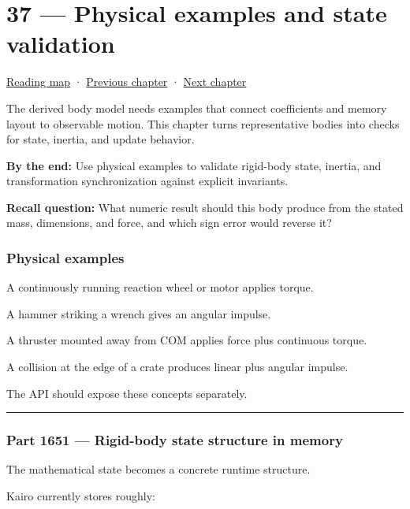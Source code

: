 \hypertarget{06-engine-ii-ch037}{}
\section{37 --- Physical examples and state validation}\label{physical-examples-and-state-validation}

\href{Chapter\%20Edition/03\%20-\%20Game\%20Engine/00\%20-\%20Reading\%20Map}{Reading map} · \hyperref[06-engine-ii-ch036]{Previous chapter} · \hyperref[06-engine-ii-ch038]{Next chapter}

The derived body model needs examples that connect coefficients and memory layout to observable motion. This chapter turns representative bodies into checks for state, inertia, and update behavior.

\textbf{By the end:} Use physical examples to validate rigid-body state, inertia, and transformation synchronization against explicit invariants.

\textbf{Recall question:} What numeric result should this body produce from the stated mass, dimensions, and force, and which sign error would reverse it?

\subsubsection{Physical examples}\label{physical-examples}

A continuously running reaction wheel or motor applies torque.

A hammer striking a wrench gives an angular impulse.

A thruster mounted away from COM applies force plus continuous torque.

A collision at the edge of a crate produces linear plus angular impulse.

The API should expose these concepts separately.

\begin{center}\rule{0.5\linewidth}{0.5pt}\end{center}

\subsubsection{Part 1651 --- Rigid-body state structure in memory}\label{part-1651-rigid-body-state-structure-in-memory}

The mathematical state becomes a concrete runtime structure.

Kairo currently stores roughly:


